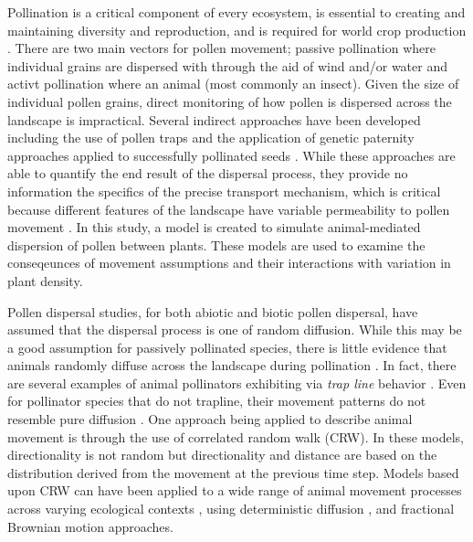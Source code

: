 Pollination is a critical component of every ecosystem, is essential to creating and maintaining
diversity and reproduction, and is required for world crop production \cite{KleinEtAl2007}.  
There are two main vectors for pollen movement; passive pollination where individual grains are 
dispersed with through the aid of wind and/or water and activt pollination where an animal (most
commonly an insect).  Given the size of individual pollen grains, direct monitoring of how pollen 
is dispersed across the landscape is impractical.  Several indirect approaches have been developed 
including the use of pollen traps and the application of genetic paternity approaches applied to 
successfully pollinated seeds \cite{BitzerPatterson1967,StreiffEtAl1999}.  While these 
approaches are able to quantify the end result of the dispersal process, they provide no information 
the specifics of the precise transport mechanism, which is critical because different features of 
the landscape have variable permeability to pollen movement \cite{DyerSork2001,DyerEtAl2012}. In 
this study, a model is created to simulate animal-mediated dispersion of pollen between plants. 
These models are used to examine the conseqeunces of movement assumptions and their interactions 
with variation in plant density.

Pollen dispersal studies, for both abiotic and biotic pollen dispersal, have assumed that the 
dispersal process is one of random diffusion.  While this may be a good assumption for passively 
pollinated species, there is little evidence that animals randomly diffuse across the landscape
during pollination \cite{LevinKerster}.  In fact, there are several examples of animal pollinators
exhibiting via \emph{trap line} behavior \cite[e.g., repeated sequential visits to individual 
plants]{OhashiThomson}. Even for pollinator species that do not trapline, their movement patterns
do not resemble pure diffusion \cite{Cresswell03}. One approach being applied to describe animal
movement is through the use of correlated random walk (CRW).  In these models, directionality is 
not random but directionality and distance are based on the distribution derived from the movement 
at the previous time step.  Models based upon CRW can have been applied to a wide range of animal
movement processes across varying ecological contexts \cite{Bartumeus07,Byers01}, using 
deterministic diffusion \cite{Klages}, and fractional Brownian motion \cite{Enriquez} approaches.

